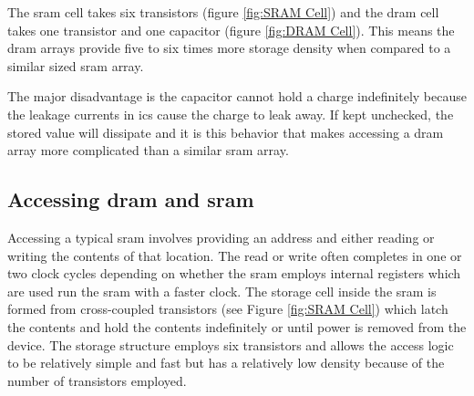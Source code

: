 \iffalse The major difference between the \ac{sram} cell and \ac{dram} cell is the number of elements it takes to implement. \fi
The \ac{sram} cell takes six transistors (figure \ref{fig:SRAM Cell}) and the \ac{dram} cell takes one transistor and one capacitor (figure \ref{fig:DRAM Cell}).
This means the \ac{dram} arrays provide five to six times more storage density when compared to a similar sized \ac{sram} array.

The major disadvantage is the capacitor cannot hold a charge indefinitely because the leakage currents in \acp{ic} cause the charge to leak away. 
If kept unchecked, the stored value will dissipate and it is this behavior that makes accessing a \ac{dram} array more complicated than a similar \ac{sram} array.

\subsection{Accessing \ac{dram} and \ac{sram}}
\label{Accessing DRAM and SRAM}

Accessing a typical \ac{sram} involves providing an address and either reading or writing the contents of that location. 
The read or write often completes in one or two clock cycles depending on whether the \ac{sram} employs internal registers which are used run the \ac{sram} with a faster clock.
The storage cell inside the \ac{sram} is formed from cross-coupled transistors (see Figure \ref{fig:SRAM Cell}) which latch the contents and hold the contents indefinitely or until power is removed from the device.
The storage structure employs six transistors and allows the access logic to be relatively simple and fast but has a relatively low density because of the number of transistors employed.

